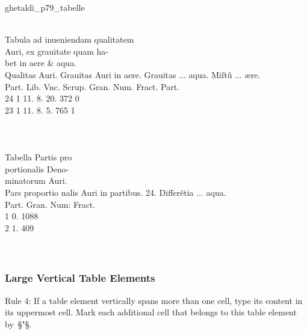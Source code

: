 \begin{sampleImage}{ghetaldi_p79_tabelle}

\begin{typeLatin}
 \\
Tabula ad inueniendam qualitatem \\
Auri, ex grauitate quam ha- \\
bet in aere & aqua.  \\
Qualitas \bold{\bs\bs} Auri. \bold{#} Grauitas Auri \bold{\bs\bs} in aere. \bold{####} Grauitas ... aqua. \bold{#} Miſt\~u ... ære. \\
Part. \bold{#} Lib. \bold{#} Vnc. \bold{#} Scrup. \bold{#} Gran. \bold{#} Num. Fract. \bold{#} Part. \\
24 \bold{#} 1 \bold{#} 11. \bold{#} 8. \bold{#} 20. \bold{#} 372 \bold{#} 0 \\
23 \bold{#} 1 \bold{#} 11. \bold{#} 8. \bold{#} 5. \bold{#} 765 \bold{#} 1 \\
\someText \\
 \\
 \\
Tabella Partis pro \\
portionalis Deno- \\
minatorum Auri. \\
Pars proportio \bold{\bs\bs} nalis Auri in \bold{\bs\bs} partibus. 24. \bold{##} Differ\~etia ... aqua. \\
Part. \bold{#} Gran. \bold{#} Num: Fract. \\
1 \bold{#} 0. \bold{#} 1088 \\
2 \bold{#} 1. \bold{#} 409 \\
\someText \\
 \\
\end{typeLatin}

\end{sampleImage}


\subsubsection{Large Vertical Table Elements}
\label{section large vertical table elements}

\begin{mainrule}
Rule 4: If a table element vertically spans more than one cell, type its content in its uppermost cell. Mark each additional cell that belongs to this table element by~§"§.
\end{mainrule}

